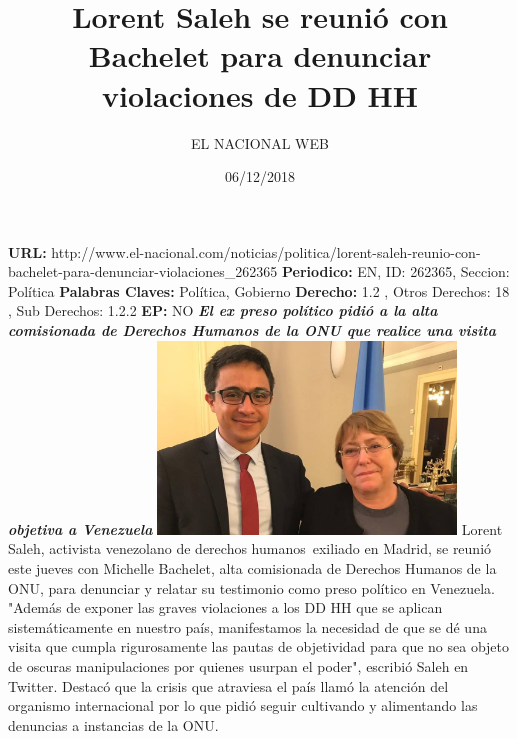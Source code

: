 \documentclass{article}%
\title{\textbf{Lorent Saleh se reunió con Bachelet para denunciar violaciones de DD HH}}%
\author{EL NACIONAL WEB}%
\date{06/12/2018}%
\begin{document}
%
\normalsize%
\maketitle%
\textbf{URL: }%
http://www.el{-}nacional.com/noticias/politica/lorent{-}saleh{-}reunio{-}con{-}bachelet{-}para{-}denunciar{-}violaciones\_262365\newline%
%
\textbf{Periodico: }%
EN, %
ID: %
262365, %
Seccion: %
Política\newline%
%
\textbf{Palabras Claves: }%
Política, Gobierno\newline%
%
\textbf{Derecho: }%
1.2%
, Otros Derechos: %
18%
, Sub Derechos: %
1.2.2%
\newline%
%
\textbf{EP: }%
NO\newline%
\newline%
%
\textbf{\textit{El ex preso político pidió a la alta comisionada de Derechos Humanos de la ONU que realice una visita objetiva a Venezuela}}%
\newline%
\newline%
%
\includegraphics[width=300px]{148.jpg}%
\newline%
%
Lorent Saleh, activista venezolano de derechos humanos~exiliado en Madrid, se reunió este jueves con Michelle Bachelet, alta comisionada de Derechos Humanos de la ONU, para denunciar y relatar su testimonio como preso político en Venezuela.%
\newline%
%
"Además de exponer las graves violaciones a los DD HH que se aplican sistemáticamente en nuestro país, manifestamos la necesidad de que se dé una visita que cumpla rigurosamente las pautas de objetividad para que no sea objeto de oscuras manipulaciones por quienes usurpan el poder", escribió Saleh en Twitter.%
\newline%
%
Destacó que la crisis que atraviesa el país llamó la atención del organismo internacional por lo que pidió seguir cultivando y alimentando las denuncias a instancias de la ONU.%
\newline%
%
\end{document}

